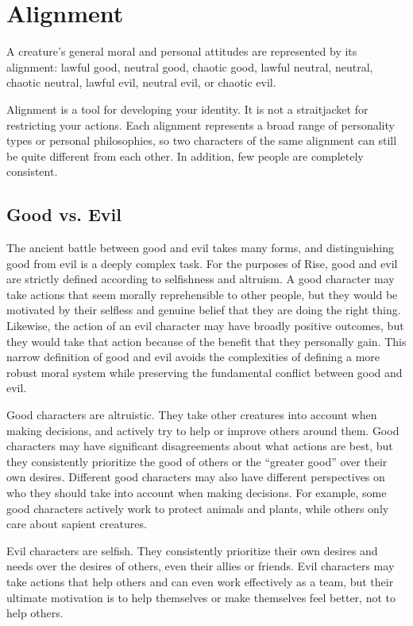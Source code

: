 \section{Alignment}\label{Alignment}
    A creature's general moral and personal attitudes are represented by its alignment: lawful good, neutral good, chaotic good, lawful neutral, neutral, chaotic neutral, lawful evil, neutral evil, or chaotic evil.

    Alignment is a tool for developing your identity.
    It is not a straitjacket for restricting your actions.
    Each alignment represents a broad range of personality types or personal philosophies, so two characters of the same alignment can still be quite different from each other.
    In addition, few people are completely consistent.

    \subsection{Good vs. Evil}
        The ancient battle between good and evil takes many forms, and distinguishing good from evil is a deeply complex task.
        For the purposes of Rise, good and evil are strictly defined according to selfishness and altruism.
        A good character may take actions that seem morally reprehensible to other people, but they would be motivated by their selfless and genuine belief that they are doing the right thing.
        Likewise, the action of an evil character may have broadly positive outcomes, but they would take that action because of the benefit that they personally gain.
        This narrow definition of good and evil avoids the complexities of defining a more robust moral system while preserving the fundamental conflict between good and evil.

         Good characters are altruistic.
        They take other creatures into account when making decisions, and actively try to help or improve others around them.
        Good characters may have significant disagreements about what actions are best, but they consistently prioritize the good of others or the ``greater good'' over their own desires.
        Different good characters may also have different perspectives on who they should take into account when making decisions.
        For example, some good characters actively work to protect animals and plants, while others only care about sapient creatures.

         Evil characters are selfish.
        They consistently prioritize their own desires and needs over the desires of others, even their allies or friends.
        Evil characters may take actions that help others and can even work effectively as a team, but their ultimate motivation is to help themselves or make themselves feel better, not to help others.

